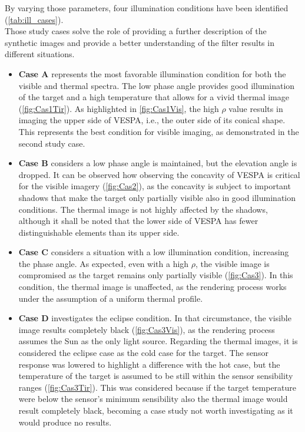 By varying those parameters, four illumination conditions have been identified (\cref{tab:ill_cases}).\\ 
Those study cases solve the role of providing a further description of the synthetic images and provide a better understanding of the filter results in different situations.\\
\begin{itemize}
    \item \textbf{Case A} represents the most favorable illumination condition for both the visible and thermal spectra. The low phase angle provides good illumination of the target and a  high temperature that allows for a vivid thermal image (\cref{fig:Cas1Tir}). As highlighted in \cref{fig:Cas1Vis}, the high $\rho$ value results in imaging the upper side of VESPA, i.e., the outer side of its conical shape. This represents the best condition for visible imaging, as demonstrated in the second study case.
    \item \textbf{Case B} considers a low phase angle is maintained, but the elevation angle is dropped. It can be observed how observing the concavity of VESPA is critical for the visible imagery  (\cref{fig:Cas2}), as the concavity is subject to important shadows that make the target only partially visible also in good illumination conditions. The thermal image is not highly affected by the shadows, although it shall be noted that the lower side of VESPA has fewer distinguishable elements than its upper side. 
    \item \textbf{Case C} considers a situation with a low illumination condition, increasing the phase angle. As expected, even with a high $\rho$, the visible image is compromised as the target remains only partially visible (\cref{fig:Cas3}). In this condition, the thermal image is unaffected, as the rendering process works under the assumption of a uniform thermal profile. \\
    \item \textbf{Case D} investigates the eclipse condition. In that circumstance, the visible image results completely black (\cref{fig:Cas3Vis}), as the rendering process assumes the Sun as the only light source. Regarding the thermal images, it is considered the eclipse case as the cold case for the target. The sensor response was lowered to highlight a difference with the hot case, but the temperature of the target is assumed to be still within the sensor sensibility ranges (\cref{fig:Cas3Tir}). This was considered because if the target temperature were below the sensor's minimum sensibility also the thermal image would result completely black, becoming a case study not worth investigating as it would produce no results. \\
\end{itemize}
